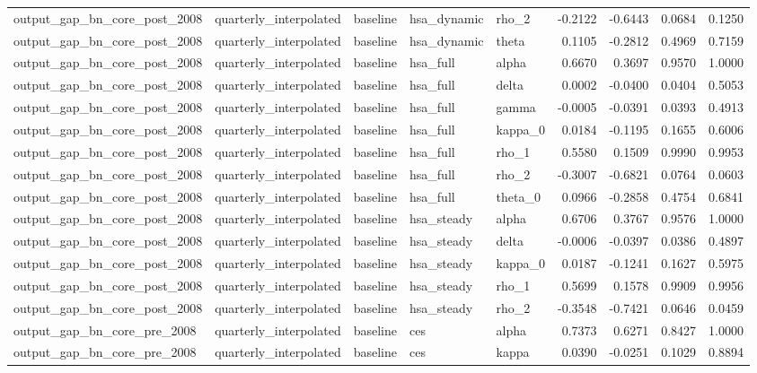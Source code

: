\begin{tabular}{lllllrrrr}
output\_gap\_bn\_core\_post\_2008 & quarterly\_interpolated & baseline & hsa\_dynamic & rho\_2 & -0.2122 & -0.6443 & 0.0684 & 0.1250 \\
output\_gap\_bn\_core\_post\_2008 & quarterly\_interpolated & baseline & hsa\_dynamic & theta & 0.1105 & -0.2812 & 0.4969 & 0.7159 \\
output\_gap\_bn\_core\_post\_2008 & quarterly\_interpolated & baseline & hsa\_full & alpha & 0.6670 & 0.3697 & 0.9570 & 1.0000 \\
output\_gap\_bn\_core\_post\_2008 & quarterly\_interpolated & baseline & hsa\_full & delta & 0.0002 & -0.0400 & 0.0404 & 0.5053 \\
output\_gap\_bn\_core\_post\_2008 & quarterly\_interpolated & baseline & hsa\_full & gamma & -0.0005 & -0.0391 & 0.0393 & 0.4913 \\
output\_gap\_bn\_core\_post\_2008 & quarterly\_interpolated & baseline & hsa\_full & kappa\_0 & 0.0184 & -0.1195 & 0.1655 & 0.6006 \\
output\_gap\_bn\_core\_post\_2008 & quarterly\_interpolated & baseline & hsa\_full & rho\_1 & 0.5580 & 0.1509 & 0.9990 & 0.9953 \\
output\_gap\_bn\_core\_post\_2008 & quarterly\_interpolated & baseline & hsa\_full & rho\_2 & -0.3007 & -0.6821 & 0.0764 & 0.0603 \\
output\_gap\_bn\_core\_post\_2008 & quarterly\_interpolated & baseline & hsa\_full & theta\_0 & 0.0966 & -0.2858 & 0.4754 & 0.6841 \\
output\_gap\_bn\_core\_post\_2008 & quarterly\_interpolated & baseline & hsa\_steady & alpha & 0.6706 & 0.3767 & 0.9576 & 1.0000 \\
output\_gap\_bn\_core\_post\_2008 & quarterly\_interpolated & baseline & hsa\_steady & delta & -0.0006 & -0.0397 & 0.0386 & 0.4897 \\
output\_gap\_bn\_core\_post\_2008 & quarterly\_interpolated & baseline & hsa\_steady & kappa\_0 & 0.0187 & -0.1241 & 0.1627 & 0.5975 \\
output\_gap\_bn\_core\_post\_2008 & quarterly\_interpolated & baseline & hsa\_steady & rho\_1 & 0.5699 & 0.1578 & 0.9909 & 0.9956 \\
output\_gap\_bn\_core\_post\_2008 & quarterly\_interpolated & baseline & hsa\_steady & rho\_2 & -0.3548 & -0.7421 & 0.0646 & 0.0459 \\
output\_gap\_bn\_core\_pre\_2008 & quarterly\_interpolated & baseline & ces & alpha & 0.7373 & 0.6271 & 0.8427 & 1.0000 \\
output\_gap\_bn\_core\_pre\_2008 & quarterly\_interpolated & baseline & ces & kappa & 0.0390 & -0.0251 & 0.1029 & 0.8894 \\

\end{tabular}
